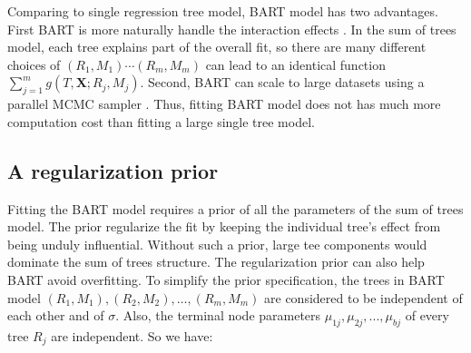 Comparing to single regression tree model, BART model has two advantages. First BART is more naturally handle the interaction effects . In the sum of trees model, each tree explains part of the overall fit, so there are many different choices of $(R_1,M_1) \cdots (R_m,M_m)$ can lead to an identical function$ \sum\limits_{j = 1}^m {g(T,\pmb{X};{R_j},{M_j})} $. Second, BART can scale to large datasets using a parallel MCMC sampler \cite{pratola2014parallel, pratola2015bayesian}. Thus, fitting BART model does not has much more computation cost than fitting a large single tree model.

\subsection{A regularization prior}
Fitting the BART model requires a prior of all the parameters of the sum of trees model.  The prior regularize the fit by keeping the individual tree's effect from being unduly influential. Without such a prior, large  tee components would dominate the sum of trees structure. The regularization prior can also help BART avoid overfitting. To simplify the prior specification, the trees in BART model $(R_1, M_1), (R_2,M_2), \ldots, (R_m, M_m) $ are considered to be independent of each other and of $\sigma$. Also, the terminal node parameters $ \mu _{1j}, \mu _{2j}, . . ., \mu _{bj} $ of every tree $R_j$ are independent. So we have:

